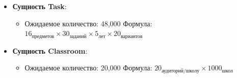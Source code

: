 \documentclass[a4paper]{article}
\begin{document}
\begin{itemize}
      \item \textbf{Сущность Task}:
            \begin{itemize}
                  \item Ожидаемое количество: 48,000 \newline
                        Формула: $16_{\text{предметов}} \times 30_{\text{заданий}} \times 5_{\text{лет}} \times 20_{\text{вариантов}}$
            \end{itemize}

      \item \textbf{Сущность Classroom}:
            \begin{itemize}
                  \item Ожидаемое количество: 20,000 \newline
                        Формула: $20_{\text{аудиторий/школу}} \times 1000_{\text{школ}}$
            \end{itemize}
\end{itemize}
\end{document}

